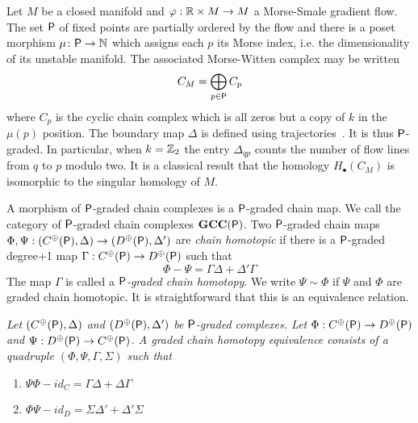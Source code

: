 \begin{ex}
Let $M$ be a closed manifold and $\varphi:{\mathbb{R}}\times M\to M$ a Morse-Smale gradient flow.  The set ${\mathsf P}$ of fixed points are partially ordered by the flow and there is a poset morphism $\mu\colon {\mathsf P}\to {\mathbb{N}}$ which assigns each $p$ its Morse index, i.e. the dimensionality of its unstable manifold.   The associated Morse-Witten complex may be written $$C_M = \bigoplus_{p\in {\mathsf P}} C_p$$ where $C_p$ is the cyclic chain complex which is all zeros but a copy of $k$ in the $\mu(p)$ position.  The boundary map $\Delta$ is defined using trajectories~\cite{robbin:salamon2, witten}.  It is thus ${\mathsf P}$-graded. In particular, when $k={\mathbb{Z}}_2$ the entry $\Delta_{qp}$ counts the number of flow lines from $q$ to $p$ modulo two.  It is a classical result that the homology $H_\bullet(C_M)$ is isomorphic to the singular homology of $M$.
\end{ex}


A morphism of ${\mathsf P}$-graded chain complexes is a ${\mathsf P}$-graded chain map.   We call the category of ${\mathsf P}$-graded chain complexes $\bf{GCC({\mathsf P})}$.   Two ${\mathsf P}$-graded chain maps $\Phi,\Psi:(C^\oplus({\mathsf P}),\Delta)\to (D^\oplus({\mathsf P}),\Delta')$ are {\em chain homotopic} if there  is a ${\mathsf P}$-graded degree+1 map $\Gamma:C^\oplus({\mathsf P})\to D^\oplus({\mathsf P})$ such that 
\[
\Phi-\Psi = \Gamma\Delta + \Delta'\Gamma
\]
 The map $\Gamma$ is called a {\em ${\mathsf P}$-graded chain homotopy}.  We write $\Psi\sim \Phi$ if $\Psi$ and $\Phi$ are graded chain homotopic.  It is straightforward that this is an equivalence relation.
 
 \begin{defn}
 {\em
Let $(C^\oplus({\mathsf P}),\Delta)$ and $(D^\oplus({\mathsf P}),\Delta')$ be ${\mathsf P}$-graded complexes.  Let $\Phi:C^\oplus({\mathsf P})\to D^\oplus({\mathsf P})$ and $\Psi:D^\oplus({\mathsf P})\to C^\oplus({\mathsf P})$.  A {\em graded chain homotopy equivalence} consists of a quadruple $(\Phi,\Psi,\Gamma,\Sigma)$ such that
\begin{enumerate}
\item $\Psi\Phi - id_C = \Gamma\Delta + \Delta \Gamma$
\item $\Phi\Psi - id_D = \Sigma\Delta' + \Delta'\Sigma$
\end{enumerate}
}
 \end{defn}
 
